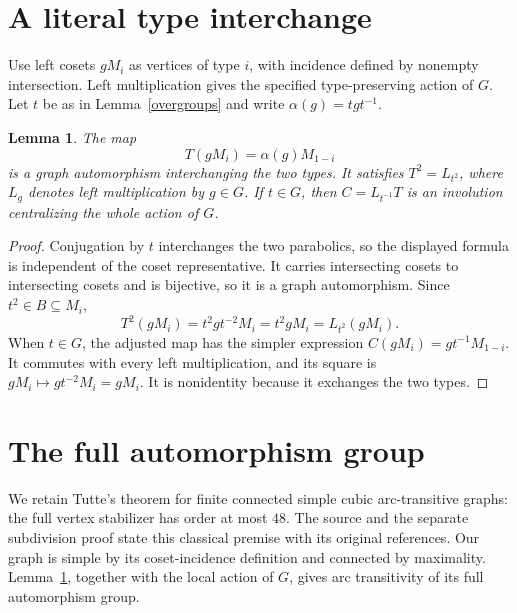 \documentclass[11pt]{article}
\newtheorem{lemma}{Lemma}
\begin{document}
\section{A literal type interchange}
Use left cosets $gM_i$ as vertices of type $i$, with incidence defined
by nonempty intersection. Left multiplication gives the specified
type-preserving action of $G$. Let $t$ be as in
Lemma~\ref{overgroups} and write $\alpha(g)=tgt^{-1}$.

\begin{lemma}\label{interchange}
The map
\[
 T(gM_i)=\alpha(g)M_{1-i}
\]
is a graph automorphism interchanging the two types. It satisfies
$T^2=L_{t^2}$, where $L_g$ denotes left multiplication by $g\in G$.
If $t\in G$, then $C=L_{t^{-1}}T$ is an involution centralizing
the whole action of $G$.
\end{lemma}
\begin{proof}
Conjugation by $t$ interchanges the two parabolics, so the displayed
formula is independent of the coset representative. It carries
intersecting cosets to intersecting cosets and is bijective, so it
is a graph automorphism. Since $t^2\in B\subseteq M_i$,
\[
 T^2(gM_i)=t^2gt^{-2}M_i=t^2gM_i=L_{t^2}(gM_i).
\]
When $t\in G$, the adjusted map has the simpler expression
$C(gM_i)=gt^{-1}M_{1-i}$. It commutes with every left multiplication,
and its square is $gM_i\mapsto gt^{-2}M_i=gM_i$. It is nonidentity
because it exchanges the two types.
\end{proof}

\section{The full automorphism group}
We retain Tutte's theorem for finite connected simple cubic
arc-transitive graphs: the full vertex stabilizer has order at most
$48$. The source and the separate subdivision proof state this
classical premise with its original references. Our graph is simple
by its coset-incidence definition and connected by maximality.
Lemma~\ref{interchange}, together with the local action of $G$,
gives arc transitivity of its full automorphism group.
\end{document}

